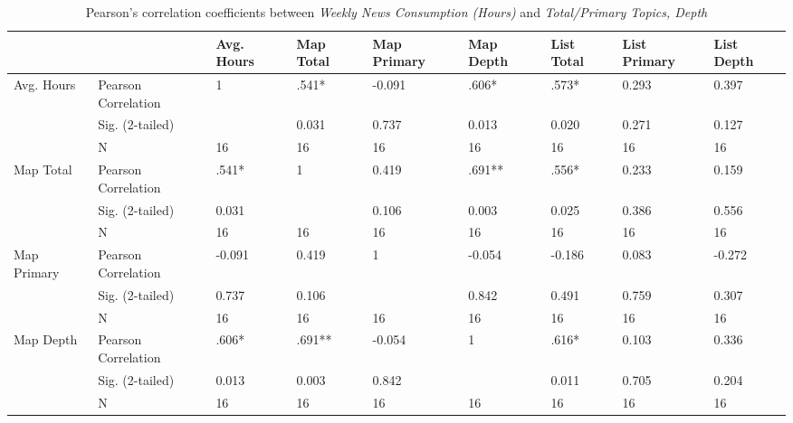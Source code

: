 \begin{landscape}
\begin{table}[hbtp!]
\centering
\caption{Pearson's correlation coefficients between \textit{Weekly News Consumption (Hours)} and \textit{Total/Primary Topics, Depth}}
\label{res:hourscorrelation}\vspace{0.3cm}
\begin{tabular}{|l|l|lllllll|}
\hline
                    &                     & Avg. Hours & Map Total & Map Primary & Map Depth & List Total & List Primary & List Depth \\ \hline
Avg. Hours & Pearson Correlation & 1                   & .541*     & -0.091      & .606*     & .573*      & 0.293        & 0.397      \\
                    & Sig. (2-tailed)     &                     & 0.031     & 0.737       & 0.013     & 0.020      & 0.271        & 0.127      \\
                    & N                   & 16                  & 16        & 16          & 16        & 16         & 16           & 16         \\
Map Total           & Pearson Correlation & .541*               & 1         & 0.419       & .691**    & .556*      & 0.233        & 0.159      \\
                    & Sig. (2-tailed)     & 0.031               &           & 0.106       & 0.003     & 0.025      & 0.386        & 0.556      \\
                    & N                   & 16                  & 16        & 16          & 16        & 16         & 16           & 16         \\
Map Primary         & Pearson Correlation & -0.091              & 0.419     & 1           & -0.054    & -0.186     & 0.083        & -0.272     \\
                    & Sig. (2-tailed)     & 0.737               & 0.106     &             & 0.842     & 0.491      & 0.759        & 0.307      \\
                    & N                   & 16                  & 16        & 16          & 16        & 16         & 16           & 16         \\
Map Depth           & Pearson Correlation & .606*               & .691**    & -0.054      & 1         & .616*      & 0.103        & 0.336      \\
                    & Sig. (2-tailed)     & 0.013               & 0.003     & 0.842       &           & 0.011      & 0.705        & 0.204      \\
                    & N                   & 16                  & 16        & 16          & 16        & 16         & 16           & 16         \\

\end{tabular}
\end{table}
\end{landscape}
